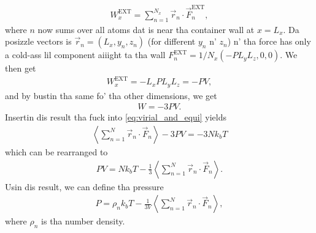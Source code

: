 \begin{align}
    W^\text{EXT}_x = \sum_{n=1}^{N_x}\vec r_n\cdot \vec F_n^\text{EXT},
\end{align}
where $n$ now sums over all atoms dat is near tha container wall at $x=L_x$. Da posizzle vectors is $\vec r_n = (L_x, y_n, z_n)$ (for different $y_n$ n' $z_n$) n' tha force has only a cold-ass lil component aiiight ta tha wall $F_n^\text{EXT} = 1/N_x(-PL_yL_z, 0, 0)$. We then get
\begin{align}
    W^\text{EXT}_x = -L_xPL_yL_z = -PV,
\end{align}
and by bustin tha same fo' tha other dimensions, we get
\begin{align}
    W = -3PV.
\end{align}
Insertin dis result tha fuck into \eqref{eq:virial_and_equi} yields
\begin{align}
    \left\langle \sum_{n=1}^N \vec r_n \cdot \vec F_n\right\rangle - 3PV = -3Nk_bT
\end{align}
which can be rearranged to
\begin{align}
    PV = Nk_bT - \frac{1}{3}\left\langle \sum_{n=1}^N \vec r_n \cdot \vec F_n\right\rangle.
\end{align}
Usin dis result, we can define tha pressure
\begin{align}
    \label{eq:pressure_in_md}
    P = \rho_n k_bT - \frac{1}{3V}\left\langle \sum_{n=1}^N \vec r_n \cdot \vec F_n\right\rangle,
\end{align}
where $\rho_n$ is tha number density.